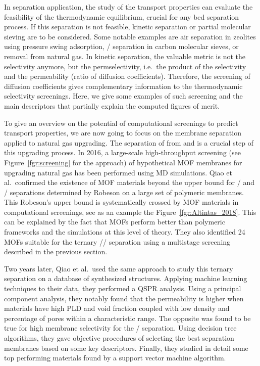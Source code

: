 \documentclass[main.tex]{subfiles}
\begin{document}
In separation application, the study of the transport properties can evaluate the feasibility of the thermodynamic equilibrium, crucial for any bed separation process. If this separation is not feasible, kinetic separation or partial molecular sieving are to be considered. Some notable examples are air separation in zeolites using pressure swing adsorption,\autocite{ruthven1990air} / separation in carbon molecular sieves,\autocite{Reid_1999} or  removal from natural gas.\autocite{Wang_2019} In kinetic separation, the valuable metric is not the selectivity anymore, but the permselectivity, i.e.\ the product of the selectivity and the permeability (ratio of diffusion coefficients). Therefore, the screening of diffusion coefficients gives complementary information to the thermodynamic selectivity screenings. Here, we give some examples of such screening and the main descriptors that partially explain the computed figures of merit.

To give an overview on the potential of computational screenings to predict transport properties, we are now going to focus on the membrane separation applied to natural gas upgrading. The separation of  from  and  is a crucial step of this upgrading process.
In 2016, a large-scale high-throughput screening (see Figure~\ref{fgr:screening} for the approach) of hypothetical MOF membranes for upgrading natural gas has been performed using MD simulations.\autocite{Qiao_2016} Qiao et al.\ confirmed the existence of MOF materials beyond the upper bound for / and / separations determined by Robeson on a large set of polymeric membranes.\autocite{robeson1991correlation} This Robeson's upper bound is systematically crossed by MOF materials in computational screenings, see as an example the Figure~\ref{fgr:Altintas_2018}. This can be explained by the fact that MOFs perform better than polymeric frameworks and the simulations at this level of theory. They also identified 24 MOFs suitable for the ternary // separation using a multistage screening described in the previous section.

Two years later, Qiao et al.\ used the same approach to study this ternary separation on a database of synthesized structures.\autocite{Qiao_2018} Applying machine learning techniques to their data, they performed a QSPR analysis. Using a principal component analysis, they notably found that the permeability is higher when materials have high PLD and void fraction coupled with low density and percentage of pores within a characteristic range. The opposite was found to be true for high membrane selectivity for the / separation. Using decision tree algorithms, they gave objective procedures of selecting the best separation membranes based on some key descriptors. Finally, they studied in detail some top performing materials found by a support vector machine algorithm.
\end{document}
